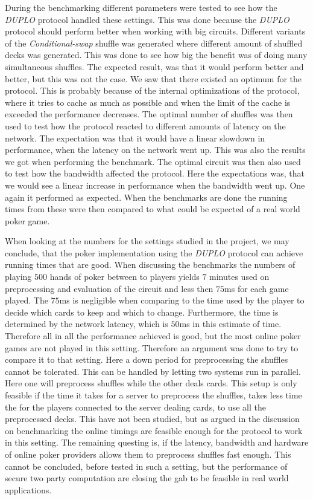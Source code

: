 \documentclass[twoside,11pt,openright]{report}
\newcommand{\CS}{\textit{Conditional-swap} }
\newcommand{\DUPLO}{\textit{DUPLO} }
\begin{document}
During the benchmarking different parameters were tested to see how the \DUPLO protocol handled these settings. This was done because the \DUPLO protocol should perform better when working with big circuits. Different variants of the \CS shuffle was generated where different amount of shuffled decks was generated. This was done to see how big the benefit was of doing many simultaneous shuffles. The expected result, was that it would perform better and better, but this was not the case. We saw that there existed an optimum for the protocol. This is probably because of the internal optimizations of the protocol, where it tries to cache as much as possible and when the limit of the cache is exceeded the performance decreases. The optimal number of shuffles was then used to test how the protocol reacted to different amounts of latency on the network. The expectation was that it would have a linear slowdown in performance, when the latency on the network went up. This was also the results we got when performing the benchmark. The optimal circuit was then also used to test how the bandwidth affected the protocol. Here the expectations was, that we would see a linear increase in performance when the bandwidth went up. One again it performed as expected. When the benchmarks are done the running times from these were then compared to what could be expected of a real world poker game.

When looking at the numbers for the settings studied in the project, we may conclude, that the poker implementation using the \DUPLO protocol can achieve running times that are good. When discussing the benchmarks the numbers of playing $500$ hands of poker between to players yields $7$ minutes used on preprocessing and evaluation of the circuit and less then $75$ms for each game played. The $75$ms is negligible when comparing to the time used by the player to decide which cards to keep and which to change. Furthermore, the time is determined by the network latency, which is $50$ms in this estimate of time. Therefore all in all the performance achieved is good, but the most online poker games are not played in this setting. Therefore an argument was done to try to compare it to that setting. Here a down period for preprocessing the shuffles cannot be tolerated. This can be handled by letting two systems run in parallel. Here one will preprocess shuffles while the other deals cards. This setup is only feasible if the time it takes for a server to preprocess the shuffles, takes less time the for the players connected to the server dealing cards, to use all the preprocessed decks. This have not been studied, but as argued in the discussion on benchmarking the online timings are feasible enough for the protocol to work in this setting. The remaining questing is, if the latency, bandwidth and hardware of online poker providers allows them to preprocess shuffles fast enough. This cannot be concluded, before tested in such a setting, but the performance of secure two party computation are closing the gab to be feasible in real world applications.
\end{document}
